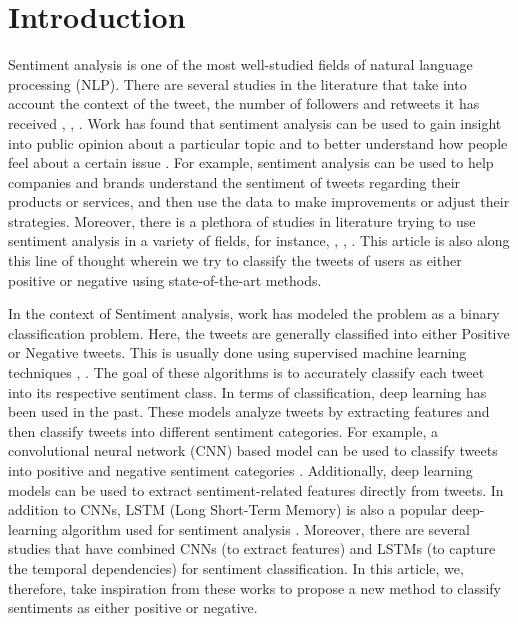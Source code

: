 \section{Introduction}\label{sec1}
Sentiment analysis is one of the most well-studied fields of natural language processing (NLP). There are several studies in the literature that take into account the context of the tweet, the number of followers and retweets it has received \cite{dang2013investigation}, \cite{al2015exploring}, \cite{montangero2015trank}. Work has found that sentiment analysis can be used to gain insight into public opinion about a particular topic and to better understand how people feel about a certain issue \cite{liu2010sentiment}. For example, sentiment analysis can be used to help companies and brands understand the sentiment of tweets regarding their products or services, and then use the data to make improvements or adjust their strategies. Moreover, there is a plethora of studies in literature trying to use sentiment analysis in a variety of fields, for instance, \cite{liu2012sentiment}, \cite{medhat2014sentiment}, \cite{baktha2017investigation}. This article is also along this line of thought wherein we try to classify the tweets of users as either positive or negative using state-of-the-art methods.


In the context of Sentiment analysis, work has modeled the problem as a binary classification problem. Here, the tweets are generally classified into either Positive or Negative tweets. This is usually done using supervised machine learning techniques \cite{kharde2016sentiment}, \cite{mandloi2020twitter}. The goal of these algorithms is to accurately classify each tweet into its respective sentiment class. In terms of classification, deep learning has been used in the past. These models analyze tweets by extracting  features and then classify tweets into different sentiment categories. For example, a convolutional neural network (CNN) based model can be used to classify tweets into positive and negative sentiment categories \cite{liao2017cnn}. Additionally, deep learning models can be used to extract sentiment-related features directly from tweets. In addition to CNNs, LSTM (Long Short-Term Memory) is also a popular deep-learning algorithm used for sentiment analysis \cite{gandhi2021sentiment}. Moreover, there are several studies that have combined CNNs (to extract features) and LSTMs (to capture the temporal dependencies) for sentiment classification. In this article, we, therefore, take inspiration from these works to propose a new method to classify sentiments as either positive or negative.


